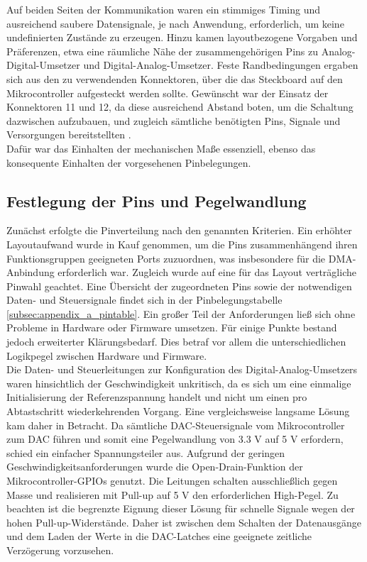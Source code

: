 \documentclass[a4paper, portrait, 12pt]{scrartcl} %
\begin{document}
Auf beiden Seiten der Kommunikation waren ein stimmiges Timing und ausreichend saubere Datensignale, je nach Anwendung, erforderlich, um keine undefinierten Zustände zu erzeugen. Hinzu kamen layoutbezogene Vorgaben und Präferenzen, etwa eine räumliche Nähe der zusammengehörigen Pins zu Analog-Digital-Umsetzer und Digital-Analog-Umsetzer. Feste Randbedingungen ergaben sich aus den zu verwendenden Konnektoren, über die das Steckboard auf den Mikrocontroller aufgesteckt werden sollte. Gewünscht war der Einsatz der Konnektoren 11 und 12, da diese ausreichend Abstand boten, um die Schaltung dazwischen aufzubauen, und zugleich sämtliche benötigten Pins, Signale und Versorgungen bereitstellten \cite[S. 70f]{STmicroelectronics2025c}.\\

Dafür war das Einhalten der mechanischen Maße essenziell, ebenso das konsequente Einhalten der vorgesehenen Pinbelegungen.\\

\subsection{Festlegung der Pins und Pegelwandlung}
\label{subsec:pin_mapping_levels}
Zunächst erfolgte die Pinverteilung nach den genannten Kriterien. Ein erhöhter Layoutaufwand wurde in Kauf genommen, um die Pins zusammenhängend ihren Funktionsgruppen geeigneten Ports zuzuordnen, was insbesondere für die DMA-Anbindung erforderlich war. Zugleich wurde auf eine für das Layout verträgliche Pinwahl geachtet. Eine Übersicht der zugeordneten Pins sowie der notwendigen Daten- und Steuersignale findet sich in der Pinbelegungstabelle \autoref{subsec:appendix_a_pintable}. Ein großer Teil der Anforderungen ließ sich ohne Probleme in Hardware oder Firmware umsetzen. Für einige Punkte bestand jedoch erweiterter Klärungsbedarf. Dies betraf vor allem die unterschiedlichen Logikpegel zwischen Hardware und Firmware.\\

Die Daten- und Steuerleitungen zur Konfiguration des Digital-Analog-Umsetzers waren hinsichtlich der Geschwindigkeit unkritisch, da es sich um eine einmalige Initialisierung der Referenzspannung handelt und nicht um einen pro Abtastschritt wiederkehrenden Vorgang. Eine vergleichsweise langsame Lösung kam daher in Betracht. Da sämtliche DAC-Steuersignale vom Mikrocontroller zum DAC führen und somit eine Pegelwandlung von 3.3 V auf 5 V erfordern, schied ein einfacher Spannungsteiler aus. Aufgrund der geringen Geschwindigkeitsanforderungen wurde die Open-Drain-Funktion der Mikrocontroller-GPIOs genutzt. Die Leitungen schalten ausschließlich gegen Masse und realisieren mit Pull-up auf 5 V den erforderlichen High-Pegel. Zu beachten ist die begrenzte Eignung dieser Lösung für schnelle Signale wegen der hohen Pull-up-Widerstände. Daher ist zwischen dem Schalten der Datenausgänge und dem Laden der Werte in die DAC-Latches eine geeignete zeitliche Verzögerung vorzusehen.\\ 
\end{document}
